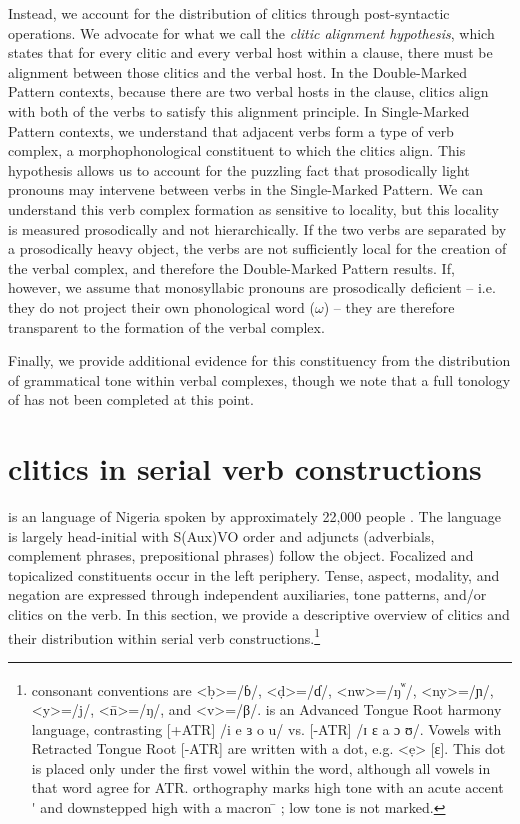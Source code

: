 \documentclass[output=paper]{langsci/langscibook}
\begin{document}
Instead, we account for the distribution of clitics through post-syntactic operations. We advocate for what we call the \textit{clitic alignment hypothesis}, which states that for every clitic and every verbal host within a clause, there must be alignment between those clitics and the verbal host. In the Double-Marked Pattern contexts, because there are two verbal hosts in the clause, clitics align with both of the verbs to satisfy this alignment principle. In Single-Marked Pattern contexts, we understand that adjacent verbs form a type of verb complex, a morphophonological constituent to which the clitics align. This hypothesis allows us to account for the puzzling fact that prosodically light pronouns may intervene between verbs in the Single-Marked Pattern. We can understand this verb complex formation as sensitive to locality, but this locality is measured prosodically and not hierarchically. If the two verbs are separated by a prosodically heavy object, the verbs are not sufficiently local for the creation of the verbal complex, and therefore the Double-Marked Pattern results. If, however, we assume that monosyllabic pronouns are prosodically deficient – i.e. they do not project their own phonological word ($\omega $) – they are therefore transparent to the formation of the verbal complex. 

Finally, we provide additional evidence for this constituency from the distribution of grammatical tone within verbal complexes, though we note that a full tonology of  has not been completed at this point. 

\section{ clitics in serial verb constructions}

 is an  language of Nigeria spoken by approximately 22,000 people \citep[5]{Kari2004}. The language is largely head-initial with S(Aux)VO order and adjuncts (adverbials, complement phrases, prepositional phrases) follow the object. Focalized and topicalized constituents occur in the left periphery. Tense, aspect, modality, and negation are expressed through independent auxiliaries, tone patterns, and/or clitics on the verb. In this section, we provide a descriptive overview of clitics and their distribution within serial verb constructions.\footnote{ consonant conventions are <ḅ>=/ɓ/, <ḍ>=/ɗ/, <nw>=/ŋ\textsuperscript{ʷ}/, <ny>=/ɲ/, <y>=/j/, <\={n}>=/ŋ/, and <v>=/β/.  is an Advanced Tongue Root harmony language, contrasting [+ATR] /i e ɜ o u/ vs. [-ATR] /ɪ ɛ a ɔ ʊ/. Vowels with Retracted Tongue Root [-ATR] are written with a dot, e.g. <ẹ> [ɛ]. This dot is placed only under the first vowel within the word, although all vowels in that word agree for ATR.  orthography marks high tone with an acute accent  \'{}  and downstepped high with a macron  \={}  ; low tone is not marked.
} 
\end{document}
